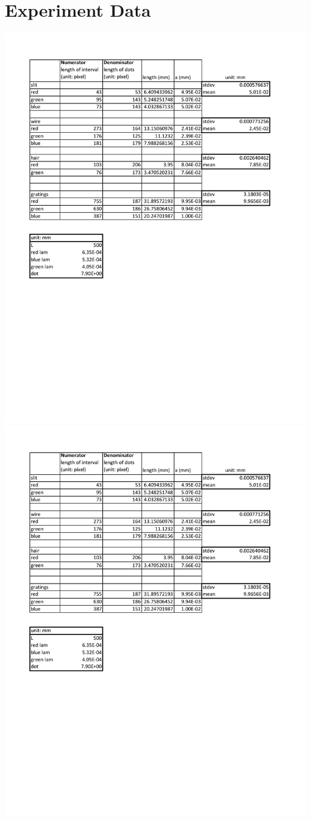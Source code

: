 \documentclass[11pt]{book}
\theoremstyle{break}
\theoremstyle{break}
\begin{document}
\newpage
\section{Experiment Data}
\begin{center}
\includegraphics[scale=0.69]{lengths.pdf}
\newpage
\includegraphics[scale=0.69, page=2]{lengths.pdf}
\end{center}
\end{document}
